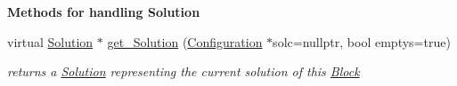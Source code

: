 \begin{Indent}\textbf{ Methods for handling Solution}\par
\begin{DoxyCompactItemize}
\item 
virtual \mbox{\hyperlink{class_s_m_spp__di__unipi__it_1_1_solution}{Solution}} $\ast$ \mbox{\hyperlink{class_s_m_spp__di__unipi__it_1_1_block_a1db67c2f65111af4314e79dfc81ba597}{get\+\_\+\+Solution}} (\mbox{\hyperlink{class_s_m_spp__di__unipi__it_1_1_configuration}{Configuration}} $\ast$solc=nullptr, bool emptys=true)
\begin{DoxyCompactList}\small\item\em returns a \mbox{\hyperlink{class_s_m_spp__di__unipi__it_1_1_solution}{Solution}} representing the current solution of this \mbox{\hyperlink{class_s_m_spp__di__unipi__it_1_1_block}{Block}} \end{DoxyCompactList}\end{DoxyCompactItemize}
\end{Indent}
